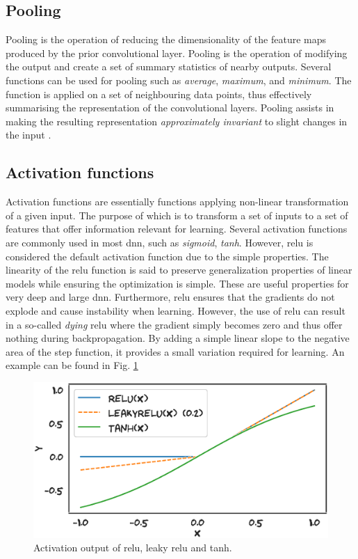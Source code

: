 \subsection{Pooling}
Pooling is the operation of reducing the dimensionality of the feature maps produced by the prior convolutional layer. Pooling is the operation of modifying the output and create a set of summary statistics of nearby outputs. Several functions can be used for pooling such as \emph{average}, \emph{maximum}, and \emph{minimum}. The function is applied on a set of neighbouring data points, thus effectively summarising the representation of the convolutional layers. Pooling assists in making the resulting representation \emph{approximately invariant} to slight changes in the input \cite{Goodfellow-et-al-2016}.


\subsection{Activation functions}
Activation functions are essentially functions applying non-linear transformation of a given input. The purpose of which is to transform a set of inputs to a set of features that offer information relevant for learning. Several activation functions are commonly used in most \gls{dnn}, such as \emph{sigmoid}, \emph{tanh}. However, \gls{relu} is considered the default activation function due to the simple properties. The linearity of the \gls{relu} function is said to preserve generalization properties of linear models while ensuring the optimization is simple. These are useful properties for very deep and large \gls{dnn}. Furthermore, \gls{relu} ensures that the gradients do not explode and cause instability when learning. However, the use of \gls{relu} can result in a so-called \emph{dying} \gls{relu} where the gradient simply becomes zero and thus offer nothing during backpropagation. By adding a simple linear slope to the negative area of the step function, it provides a small variation required for learning. An example can be found in Fig. \ref{fig:leakyrelu}

\begin{figure}
    \centering
    \includegraphics[width=\textwidth]{chapters/figures/relu_leakyrelu_example.eps}
    \caption{Activation output of \gls{relu}, leaky \gls{relu} and tanh.}
    \label{fig:leakyrelu}
\end{figure}


